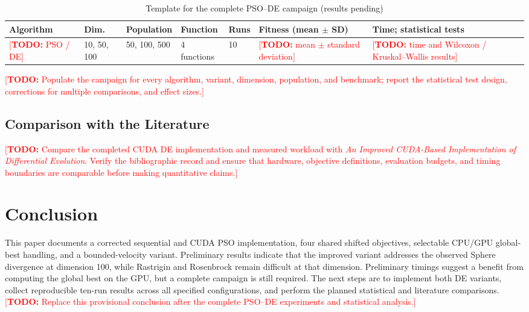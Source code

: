 \documentclass[conference]{IEEEtran}
\newcommand{\todo}[1]{\textcolor{red}{[\textbf{TODO:} #1]}}
\begin{document}
\begin{table}[t]
\centering
\caption{Template for the complete PSO--DE campaign (results pending)}
\label{tab:full-campaign}
\begin{tabular}{p{1.4cm}p{1.2cm}p{1.5cm}p{1.5cm}p{0.8cm}p{3.5cm}p{4.0cm}}
\toprule
\textbf{Algorithm} & \textbf{Dim.} & \textbf{Population} &
\textbf{Function} & \textbf{Runs} & \textbf{Fitness (mean $\pm$ SD)} &
\textbf{Time; statistical tests}\\
\midrule
\todo{PSO / DE} & 10, 50, 100 & 50, 100, 500 &
4 functions & 10 & \todo{mean $\pm$ standard deviation} &
\todo{time and Wilcoxon / Kruskal--Wallis results}\\
\bottomrule
\end{tabular}
\end{table}
\todo{Populate the campaign for every algorithm, variant, dimension,
population, and benchmark; report the statistical test design, corrections
for multiple comparisons, and effect sizes.}

\subsection{Comparison with the Literature}
\label{sec:literature}
\todo{Compare the completed CUDA DE implementation and measured workload with
\emph{An Improved CUDA-Based Implementation of Differential Evolution}.
Verify the bibliographic record and ensure that hardware, objective
definitions, evaluation budgets, and timing boundaries are comparable before
making quantitative claims.}

\section{Conclusion}
\label{sec:conclusion}
This paper documents a corrected sequential and CUDA PSO implementation,
four shared shifted objectives, selectable CPU/GPU global-best handling, and
a bounded-velocity variant. Preliminary results indicate that the improved
variant addresses the observed Sphere divergence at dimension 100, while
Rastrigin and Rosenbrock remain difficult at that dimension. Preliminary
timings suggest a benefit from computing the global best on the GPU, but a
complete campaign is still required. The next steps are to implement both
DE variants, collect reproducible ten-run results across all specified
configurations, and perform the planned statistical and literature
comparisons.
\todo{Replace this provisional conclusion after the complete PSO--DE
experiments and statistical analysis.}



\end{document}
